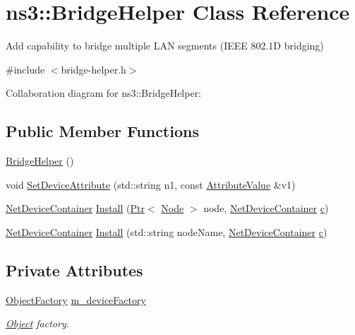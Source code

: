 \hypertarget{classns3_1_1BridgeHelper}{}\section{ns3\+:\+:Bridge\+Helper Class Reference}
\label{classns3_1_1BridgeHelper}


Add capability to bridge multiple L\+AN segments (I\+E\+EE 802.\+1D bridging)  




{\ttfamily \#include $<$bridge-\/helper.\+h$>$}



Collaboration diagram for ns3\+:\+:Bridge\+Helper\+:
\subsection*{Public Member Functions}
\begin{DoxyCompactItemize}
\item 
\hyperlink{classns3_1_1BridgeHelper_ad63544d31fbe2c2df6f617da45965dcf}{Bridge\+Helper} ()
\item 
void \hyperlink{classns3_1_1BridgeHelper_a7077a65b81aab176e75d62515b565477}{Set\+Device\+Attribute} (std\+::string n1, const \hyperlink{classns3_1_1AttributeValue}{Attribute\+Value} \&v1)
\item 
\hyperlink{classns3_1_1NetDeviceContainer}{Net\+Device\+Container} \hyperlink{classns3_1_1BridgeHelper_aba53f6381b7adda00d9163840b072fa6}{Install} (\hyperlink{classns3_1_1Ptr}{Ptr}$<$ \hyperlink{classns3_1_1Node}{Node} $>$ node, \hyperlink{classns3_1_1NetDeviceContainer}{Net\+Device\+Container} \hyperlink{mmwave_2model_2fading-traces_2fading__trace__generator_8m_ae0323a9039add2978bf5b49550572c7c}{c})
\item 
\hyperlink{classns3_1_1NetDeviceContainer}{Net\+Device\+Container} \hyperlink{classns3_1_1BridgeHelper_af7ce2cef48c2beb4b280d74f22663b6c}{Install} (std\+::string node\+Name, \hyperlink{classns3_1_1NetDeviceContainer}{Net\+Device\+Container} \hyperlink{mmwave_2model_2fading-traces_2fading__trace__generator_8m_ae0323a9039add2978bf5b49550572c7c}{c})
\end{DoxyCompactItemize}
\subsection*{Private Attributes}
\begin{DoxyCompactItemize}
\item 
\hyperlink{classns3_1_1ObjectFactory}{Object\+Factory} \hyperlink{classns3_1_1BridgeHelper_a89ec6034749234a1388a0505eb9e683a}{m\+\_\+device\+Factory}
\begin{DoxyCompactList}\small\item\em \hyperlink{classns3_1_1Object}{Object} factory. \end{DoxyCompactList}\end{DoxyCompactItemize}


